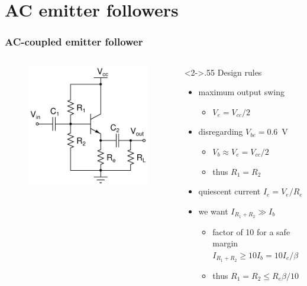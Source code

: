 \documentclass[beamer]{standalone}
\begin{document}
\section{AC emitter followers}
\frame
{ \frametitle{AC-coupled emitter follower}
\begin{columns}[c]
 \begin{column}{.45\textwidth}
  \begin{figure}
   \includegraphics[height=0.50\textheight]{./schematics/npn_ac_emitter_follower}
  \end{figure}
 \end{column}
 \begin{column}<2->{.55\textwidth}
  Design rules
  \begin{itemize}
   \item maximum output swing 
    \begin{itemize}
     \item $V_e=V_{cc} /2 $
    \end{itemize}
   \item disregarding  $V_{be}=0.6$~V
    \begin{itemize}
     \item $V_b \approx V_e=V_{cc}/{2}$
     \item thus $R_1=R_2$
    \end{itemize}
   \item quiescent current
    $I_e=V_e/R_e$
   \item we want $I_{R_1+R_2} \gg I_b$
    \begin{itemize}
     \item factor of 10 for a safe margin
      $I_{R_1+R_2} \ge 10 I_b = 10 I_e / \beta$
     \item thus $R_1=R_2 \le  R_e\beta /10$
    \end{itemize}
  \end{itemize}
 \end{column}
\end{columns}
 
 }
\end{document}
